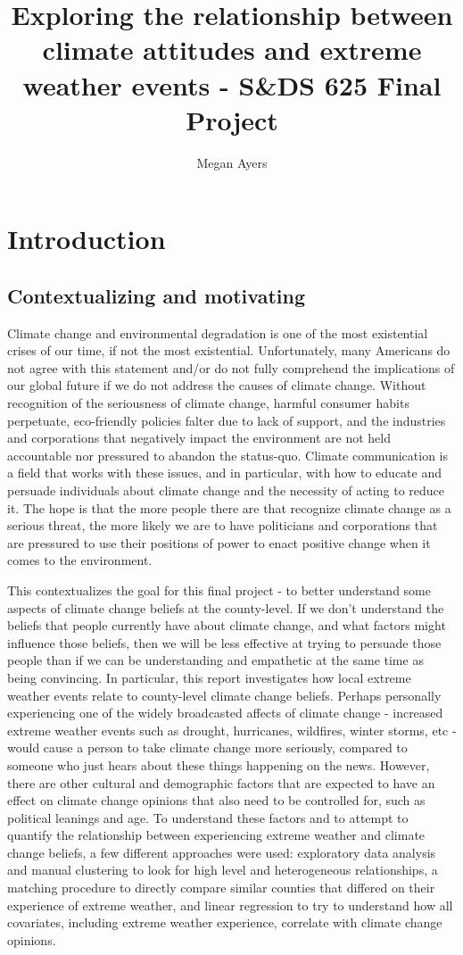 \documentclass{article}
\title{Exploring the relationship between climate attitudes and extreme weather events - S\&DS 625 Final Project}
\author{Megan Ayers}
\begin{document}
\maketitle

\section{Introduction}
\subsection{Contextualizing and motivating}
Climate change and environmental degradation is one of the most existential
crises of our time, if not the most existential. Unfortunately, many
Americans do not agree with this statement and/or do not fully comprehend the
implications of our global future if we do not address the causes of
climate change. Without recognition of the seriousness of climate change,
harmful consumer habits perpetuate, eco-friendly policies falter due to lack
of support, and the industries and corporations that negatively impact the
environment are not held accountable nor pressured to abandon the status-quo.
Climate communication is a field that works with these issues, and in
particular, with how to educate and persuade individuals about climate
change and the necessity of acting to reduce it. The hope is that
the more people there are that recognize climate change as a serious threat,
the more likely we are to have politicians and corporations that are
pressured to use their positions of power to enact positive change when it
comes to the environment. 

This contextualizes the goal for this final project - to better understand
some aspects of climate change beliefs at the county-level. If we don't 
understand the beliefs that people currently have about climate change,
and what factors might influence those beliefs, then we will be less
effective at trying to persuade those people than if we can be understanding
and empathetic at the same time as being convincing. In particular, this
report investigates how local extreme weather events relate to county-level
climate change beliefs. Perhaps personally experiencing one of
the widely broadcasted affects of climate change - increased extreme weather
events such as drought, hurricanes, wildfires, winter storms, etc - would
cause a person to take climate change more seriously, compared to someone
who just hears about these things happening on the news. However, there are
other cultural and demographic factors that are expected to have an effect
on climate change opinions that also need to be controlled for, such as
political leanings and age. To understand these factors and to attempt to quantify the relationship between experiencing extreme weather and climate change beliefs, a few different approaches were used: exploratory data analysis and manual clustering to look for high level and heterogeneous relationships, a matching procedure to directly compare similar counties that differed on their experience of extreme weather, and linear regression to try to understand how all covariates, including extreme weather experience, correlate with climate change opinions. 
\end{document}

